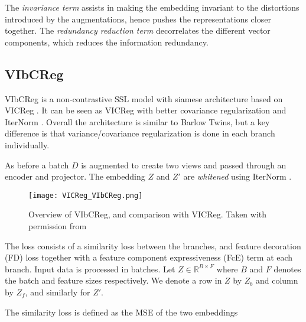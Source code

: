 \documentclass[../../thesis.tex]{subfiles}
\begin{document}
The \textit{invariance term} assists in making the embedding invariant to the distortions introduced by the augmentations, hence pushes the representations closer together. The \textit{redundancy reduction term} decorrelates the different vector components, which reduces the information redundancy. \newline



\subsection{VIbCReg}

VIbCReg \cite{lee2024vibcreg} is a non-contrastive SSL model with siamese architecture based on VICReg \cite{bardes2022vicreg}. It can be seen as VICReg with better covariance regularization and IterNorm \cite{huang2019iterative}. Overall the architecture is similar to Barlow Twins, but a key difference is that variance/covariance regularization is done in each branch individually.\newline

As before a batch $D$ is augmented to create two views and passed through an encoder and projector. The embedding $Z$ and $Z'$ are \textit{whitened}  using IterNorm \cite{huang2019iterative}.\newline

\begin{figure}[h]
    \texttt{[image: VICReg\_VIbCReg.png]}
    \centering    
    \caption{Overview of VIbCReg, and comparison with VICReg. Taken with permission from \cite{lee2024computer}}
\end{figure}

The loss consists of a similarity loss between the branches, and feature decoration (FD) loss together with a feature component expressiveness (FcE) term at each branch. Input data is processed in batches. Let $Z \in \mathbb{R}^{B\times F}$ where $B$ and $F$ denotes the batch and feature sizes respectively. We denote a row in $Z$ by $Z_b$ and column by $Z_f$, and similarly for $Z'$. \newline

The similarity loss is defined as the MSE of the two embeddings
\end{document}
